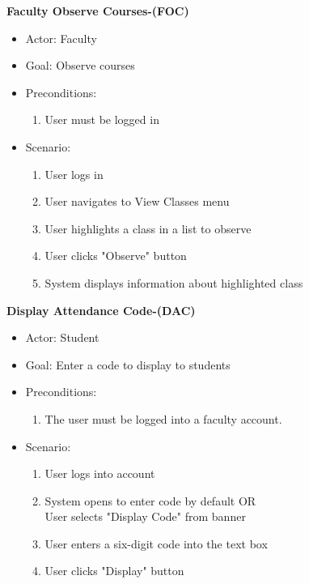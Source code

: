 \documentclass[letterpaper,12pt,oneside,listof=totoc]{scrreprt}
\begin{document}
\hfill \break
\textbf{Faculty Observe Courses-(FOC)}
\begin{itemize}
    \item Actor: Faculty
    \item Goal: Observe courses
    \item Preconditions:
    \begin{enumerate}
        \item User must be logged in
    \end{enumerate}
    \item Scenario:
    \begin{enumerate}
        \item User logs in
        \item User navigates to View Classes menu
        \item User highlights a class in a list to observe
        \item User clicks "Observe" button
        \item System displays information about highlighted class
    \end{enumerate}
\end{itemize}

\hfill \break
\textbf{Display Attendance Code-(DAC)}
\begin{itemize}
    \item Actor: Student
    \item Goal: Enter a code to display to students
    \item Preconditions:
    \begin{enumerate}
        \item The user must be logged into a faculty account.
    \end{enumerate}
    \item Scenario:
    \begin{enumerate}
        \item User logs into account
        \item System opens to enter code by default OR \\ User selects "Display Code" from banner
        \item User enters a six-digit code into the text box
        \item User clicks "Display" button
    \end{enumerate}
\end{itemize}
\end{document}
